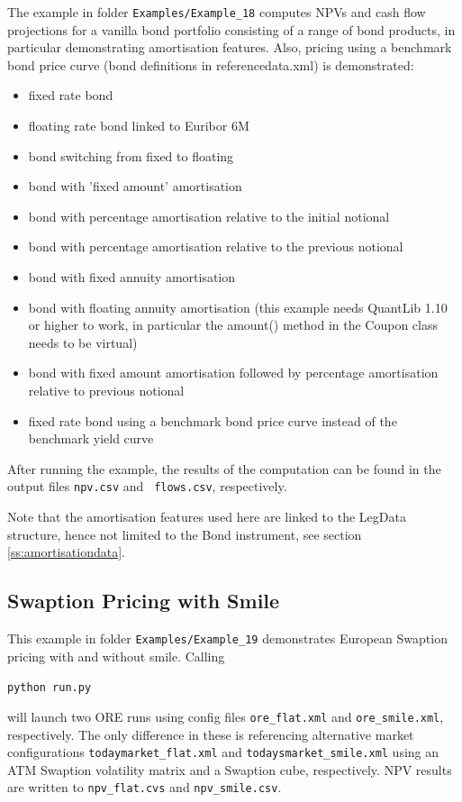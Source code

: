 \documentclass[12pt, a4paper]{article}
\begin{document}
The example in folder {\tt Examples/Example\_18} computes NPVs and cash flow projections for a vanilla bond portfolio
consisting of a range of bond products, in particular demonstrating amortisation features. Also, pricing using a benchmark bond price curve (bond definitions in referencedata.xml) is demonstrated:
\begin{itemize}
\item fixed rate bond
\item floating rate bond linked to Euribor 6M
\item bond switching from fixed to floating
\item bond with 'fixed amount' amortisation
\item bond with percentage amortisation relative to the initial notional
\item bond with percentage amortisation relative to the previous notional
\item bond with fixed annuity amortisation
\item bond with floating annuity amortisation (this example needs QuantLib 1.10 or higher to work, in particular the amount() method in the Coupon class needs to be virtual)
\item bond with fixed amount amortisation followed by percentage amortisation relative to previous notional
\item fixed rate bond using a benchmark bond price curve instead of the benchmark yield curve
\end{itemize}

After running the example, the results of the computation can be found in the output files {\tt npv.csv} and {\tt
  flows.csv}, respectively.

\medskip
Note that the amortisation features used here are linked to the LegData structure, hence not limited to the Bond instrument, see section \ref{ss:amortisationdata}.

\subsection{Swaption Pricing with Smile}%

This example in folder {\tt Examples/Example\_19} demonstrates European Swaption pricing with and without smile. Calling

\medskip
\centerline{\tt python run.py}

\medskip
will launch two ORE runs using config files {\tt ore\_flat.xml} and {\tt ore\_smile.xml}, respectively. The only difference in these is referencing alternative market configurations {\tt todaymarket\_flat.xml} and {\tt todaysmarket\_smile.xml} using an ATM Swaption volatility matrix and a Swaption cube, respectively. NPV results are written to {\tt npv\_flat.cvs} and {\tt npv\_smile.csv}.
\end{document}
